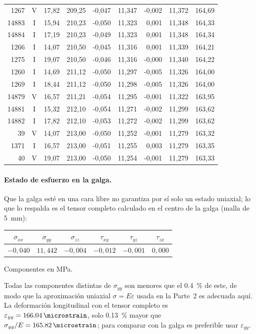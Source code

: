 \documentclass[11pt,a4paper]{article}
\begin{document}
{\begin{longtable}{rcrrrrrrr}
1267 & V & 17,82 & 209,25 & -0,047 & 11,347 & -0,002 & 11,372 & 164,69 \\
14883 & I & 15,94 & 210,23 & -0,050 & 11,323 & 0,001 & 11,348 & 164,33 \\
14884 & I & 17,19 & 210,23 & -0,049 & 11,323 & 0,001 & 11,348 & 164,34 \\
1266 & I & 14,07 & 210,50 & -0,045 & 11,316 & 0,001 & 11,339 & 164,21 \\
1275 & I & 19,07 & 210,50 & -0,046 & 11,316 & -0,000 & 11,340 & 164,22 \\
1260 & I & 14,69 & 211,12 & -0,050 & 11,297 & -0,005 & 11,326 & 164,00 \\
1269 & I & 18,44 & 211,12 & -0,050 & 11,298 & -0,005 & 11,326 & 164,00 \\
14879 & V & 16,57 & 211,21 & -0,054 & 11,295 & -0,001 & 11,322 & 163,95 \\
14881 & I & 15,32 & 212,10 & -0,054 & 11,271 & -0,002 & 11,299 & 163,62 \\
14882 & I & 17,82 & 212,10 & -0,053 & 11,272 & -0,002 & 11,299 & 163,62 \\
39 & V & 14,07 & 213,00 & -0,050 & 11,252 & -0,001 & 11,279 & 163,32 \\
1371 & I & 16,57 & 213,00 & -0,051 & 11,255 & 0,003 & 11,279 & 163,35 \\
40 & V & 19,07 & 213,00 & -0,050 & 11,254 & -0,001 & 11,279 & 163,33 \\
\end{longtable}
}

\paragraph{Estado de esfuerzo en la galga.} Que la galga est\'e en una cara libre no garantiza por s\'i solo un estado uniaxial; lo que lo respalda es el tensor completo calculado en el centro de la galga (malla de \SI{5}{mm}):
\begin{center}
\small
\begin{tabular}{cccccc}
\toprule
$\sigma_{xx}$ & $\sigma_{yy}$ & $\sigma_{zz}$ & $\tau_{xy}$ & $\tau_{yz}$ & $\tau_{zx}$ \\
\midrule
$-0{,}040$ & $11{,}442$ & $-0{,}004$ & $-0{,}012$ & $-0{,}001$ & $0{,}000$ \\
\bottomrule
\end{tabular}

\smallskip
Componentes en MPa.
\end{center}
Todas las componentes distintas de $\sigma_{yy}$ son menores que el \SI{0,4}{\percent} de este, de modo que la aproximaci\'on uniaxial $\sigma=E\varepsilon$ usada en la Parte~2 es adecuada aqu\'i. La deformaci\'on longitudinal con el tensor completo es $\varepsilon_{yy}=\SI{166,04}{\microstrain}$, solo \SI{0,13}{\percent} mayor que $\sigma_{yy}/E=\SI{165,82}{\microstrain}$; para comparar con la galga es preferible usar $\varepsilon_{yy}$.
\end{document}

